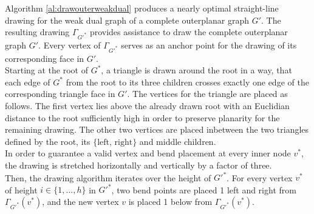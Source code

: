 Algorithm \ref{al:drawouterweakdual} produces a nearly optimal straight-line drawing for the weak dual graph of a complete outerplanar graph $G'$. The resulting drawing $\Gamma_{G'^*}$ provides assistance to draw the complete outerplanar graph $G'$. Every vertex of $\Gamma_{G'^*}$ serves as an anchor point for the drawing of its corresponding face in $G'$.\\
Starting at the root of $G^*$, a triangle is drawn around the root in a way, that each edge of $G^*$ from the root to its three children crosses exactly one edge of the corresponding triangle face in $G'$. The vertices for the triangle are placed as follows. The first vertex lies above the already drawn root with an Euclidian distance to the root sufficiently high in order to preserve planarity for the remaining drawing. The other two vertices are placed inbetween the two triangles defined by the root, its $\{\text{left, right}\}$ and middle children.\\
In order to guarantee a valid vertex and bend placement at every inner node $v^*$, the drawing is stretched horizontally and vertically by a factor of three.\\
Then, the drawing algorithm iterates over the height of $G'^*$. For every vertex $v^*$ of height $i\in \{1,...,h\}$ in $G'^*$, two bend points are placed 1 \UL left and right from $\Gamma_{G'^*}(v^*)$, and the new vertex $v$ is placed 1 \UL below from $\Gamma_{G'^*}(v^*)$.
